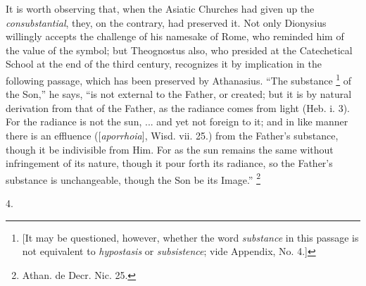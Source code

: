 It is worth observing that, when the Asiatic Churches had given up
the \emph{consubstantial}, they, on the contrary, had preserved it.
Not only Dionysius willingly accepts the challenge of his namesake of
Rome, who reminded him of the value of the symbol; but Theognostus
also, who presided at the Catechetical School at the end of the third
century, recognizes it by implication in the following passage, which
has been preserved by Athanasius. ``The substance \footnote{[It may be questioned, however, whether
the word \emph{substance} in this passage is not equivalent to \emph{hypostasis}
or \emph{subsistence}; vide Appendix, No. 4.]} of the Son,'' he says, ``is not external to the
Father, or created; but it is by natural derivation from that of the
Father, as the radiance comes from light (Heb. i. 3). For the radiance
is not the sun, ... and yet not foreign to it; and in like manner
there is an effluence ([\emph{aporrhoia}], Wisd. vii. 25.) from the
Father's substance, though it be indivisible from Him. For as the sun
remains the same without infringement of its nature, though it pour
forth its radiance, so the Father's substance is unchangeable, though
the Son be its Image.'' \footnote{Athan. de Decr. Nic. 25.}

4.

